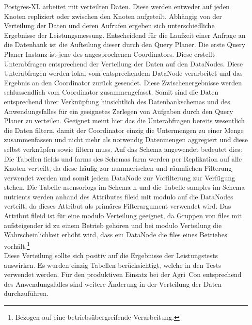 Postgres-XL arbeitet mit verteilten Daten.
Diese werden entweder auf jeden Knoten repliziert oder zwischen den Knoten aufgeteilt.
Abhängig von der Verteilung der Daten und deren Aufrufen ergeben sich unterschiedliche Ergebnisse der Leistungsmessung.
Entscheidend für die Laufzeit einer Anfrage an die Datenbank ist die Aufteilung dieser durch den Query Planer.
Die erste Query Planer Instanz ist jene des angesprochenen Coordinators.
Diese erstellt Unterabfragen entsprechend der Verteilung der Daten auf den DataNodes.
Diese Unterabfragen werden lokal vom entsprechendem DataNode verarbeitet und das Ergebnis an den Coordinator zurück gesendet.
Diese Zwischenergebnisse werden schlussendlich vom Coordinator zusammengefasst.
Somit sind die Daten entsprechend ihrer Verknüpfung hinsichtlich des Datenbankschemas und des Anwendungsfalles für ein geeignetes Zerlegen von Aufgaben durch den Query Planer zu verteilen.
Geeignet meint hier das die Unterabfragen bereits wesentlich die Daten filtern, damit der Coordinator einzig die Untermengen zu einer Menge zusammenfassen und nicht mehr als notwendig Datenmengen aggregiert und diese selbst verknüpfen sowie filtern muss.
Auf das Schema angewendet bedeutet dies:
Die Tabellen fields und farms des Schemas farm werden per Replikation auf alle Knoten verteilt, da diese häufig zur nummerischen und räumlichen Filterung verwendet werden und somit jedem DataNode zur Vorfilterung zur Verfügung stehen.
Die Tabelle nsensorlogs im Schema n und die Tabelle samples im Schema nutrients werden anhand des Attributes fileid mit modulo auf die DataNodes verteilt, da dieses Attribut als primäres Filterargument verwendet wird.
Das Attribut fileid ist für eine modulo Verteilung geeignet, da Gruppen von files mit aufsteigender id zu einem Betrieb gehören und bei modulo Verteilung die Wahrscheinlichkeit erhöht wird, dass ein DataNode die files eines Betriebes vorhält.\footnote{Bezogen auf eine betriebsübergreifende Verarbeitung.}\\
Diese Verteilung sollte sich positiv auf die Ergebnisse der Leistungstests auswirken.
Es wurden einzig Tabellen berücksichtigt, welche in den Tests verwendet werden.
Für den produktiven Einsatz bei der Agri~Con entsprechend des Anwendungsfalles sind weitere Änderung in der Verteilung der Daten durchzuführen.

